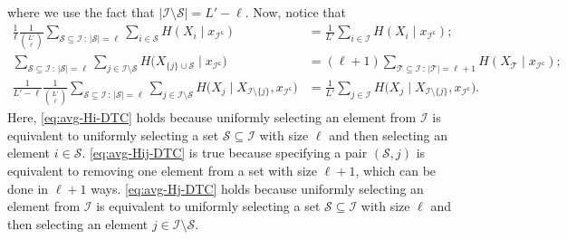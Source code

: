 \documentclass[english]{article}
\newcommand{\cS}{\mathcal{S}}
\newcommand{\cI}{\mathcal{I}}
\newcommand{\cT}{\mathcal{T}}
\begin{document}
where we use the fact that $|\cI\setminus \cS| = L'-\ell$.
Now, notice that 
\begin{align}
    \frac{1}{\ell}\frac{1}{\binom{L'}{\ell}}\sum_{\cS \subseteq \cI \,:\, |\cS|=\ell} \sum_{i \in \cS} H(X_i \mid x_{\cI^\mathsf{c}}) & = \frac{1}{L'} \sum_{i \in \cI} H(X_i \mid x_{\cI^\mathsf{c}}); \label{eq:avg-Hi-DTC}\\
\sum_{\cS \subseteq \cI \,:\,|\cS|=\ell}\sum_{j \in \cI \setminus \cS} H\big(X_{\{j\} \cup \cS} \mid x_{\cI^\mathsf{c}}\big) &= (\ell + 1) \sum_{\cT \subseteq \cI \,:\,|\cT|=\ell+1} H(X_{\cT} \mid x_{\cI^\mathsf{c}}); \label{eq:avg-Hij-DTC} \\
\frac{1}{L'-\ell}\frac{1}{\binom{L'}{\ell}} \sum_{\cS \subseteq \cI \,:\, |\cS|=\ell} \sum_{j \in \cI \setminus \cS } H\big(X_j \mid X_{\cI \setminus \{j\}}, x_{\cI^\mathsf{c}}\big) & = \frac1{L'}\sum_{j\in\cI } H\big(X_j \mid X_{\cI \setminus \{j\}}, x_{\cI^\mathsf{c}}\big). \label{eq:avg-Hj-DTC} 
\end{align}
Here, \eqref{eq:avg-Hi-DTC} holds because uniformly selecting an element from $\cI$ is equivalent to uniformly selecting a set $\cS \subseteq \cI$ with size $\ell$ and then selecting an element $i \in \cS$. \eqref{eq:avg-Hij-DTC} is true because specifying a pair $(\cS,j)$ is equivalent to removing one element from a set with size $\ell+1$, which can be done in $\ell + 1$ ways. \eqref{eq:avg-Hj-DTC} holds because uniformly selecting an element from $\cI$ is equivalent to uniformly selecting a set $\cS \subseteq \cI$ with size $\ell$ and then selecting an element $j \in \cI \setminus \cS$.
\end{document}
